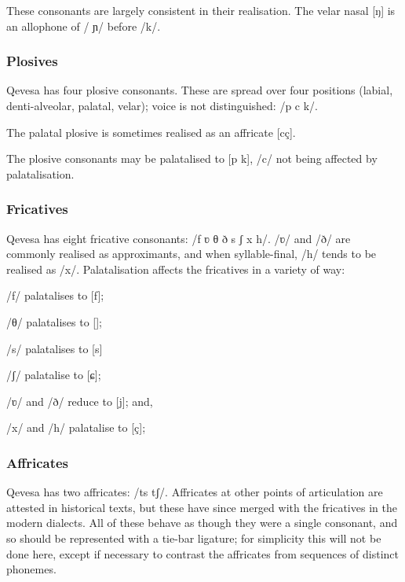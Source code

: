 \documentclass[grammar]{subfiles}
\begin{document}
  These consonants are largely consistent in their realisation. %
  The velar nasal [ŋ] is an allophone of / ɲ/ before /k/.

  \subsubsection{Plosives}
  \label{sssec:plosives}

  Qevesa has four plosive consonants. These are spread over four positions (labial, denti-alveolar, palatal, velar); voice is not distinguished: /p  c k/. 
  
  The palatal plosive is sometimes realised as an affricate [cç].

  The plosive consonants may be palatalised to [p\superj{}  k\superj], /c/ not being affected by palatalisation.

  \subsubsection{Fricatives}
  \label{sssec:fricatives}

  Qevesa has eight fricative consonants: /f ʋ θ ð s ʃ x h/. /ʋ/ and /ð/ are commonly realised as approximants, and when syllable-final, /h/ tends to be realised as /x/. 
  Palatalisation affects the fricatives in a variety of way: 
 
  \begin{itemize*}
    \item /f/ palatalises to [f\superj{}];
    \item /θ/ palatalises to [];
    \item /s/ palatalises to [s\superj]
    \item /ʃ/ palatalise to [ɕ];
    \item /ʋ/ and /ð/ reduce to [j]; and,
    \item /x/ and /h/ palatalise to [ç];
  \end{itemize*}

  \subsubsection{Affricates}
  \label{sssec:affricates}

  Qevesa has two affricates: /ts tʃ/. Affricates at other points of articulation are attested in historical texts, but these have since merged with the fricatives in the modern dialects. All of these behave as though they were a single consonant, and so should be represented with a tie-bar ligature; for simplicity this will not be done here, except if necessary to contrast the affricates from sequences of distinct phonemes. 
\end{document}

